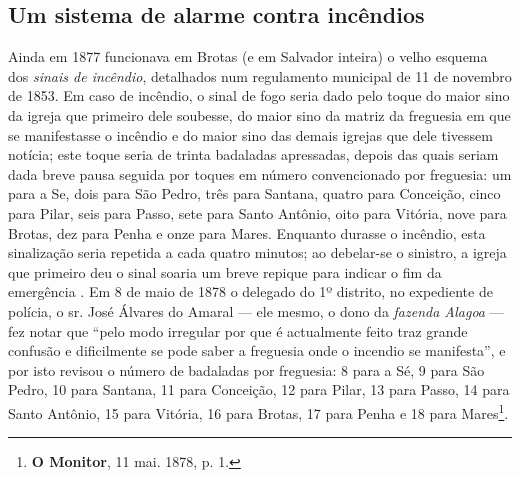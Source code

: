 \subsection{Um sistema de alarme contra incêndios}

Ainda em 1877 funcionava em Brotas (e em Salvador inteira) o velho esquema dos \textit{sinais de incêndio}, detalhados num regulamento municipal de 11 de novembro de 1853. Em caso de incêndio, o sinal de fogo seria dado pelo toque do maior sino da igreja que primeiro dele soubesse, do maior sino da matriz da freguesia em que se manifestasse o incêndio e do maior sino das demais igrejas que dele tivessem notícia; este toque seria de trinta badaladas apressadas, depois das quais seriam dada breve pausa seguida por toques em número convencionado por freguesia: um para a Se, dois para São Pedro, três para Santana, quatro para Conceição, cinco para Pilar, seis para Passo, sete para Santo Antônio, oito para Vitória, nove para Brotas, dez para Penha e onze para Mares. Enquanto durasse o incêndio, esta sinalização seria repetida a cada quatro minutos; ao debelar-se o sinistro, a igreja que primeiro deu o sinal soaria um breve repique para indicar o fim da emergência \cite[pp.~192-193]{macosta_almana_1877}. Em 8 de maio de 1878 o delegado do 1º distrito, no expediente de polícia, o sr. José Álvares do Amaral --- ele mesmo, o dono da \textit{fazenda Alagoa} --- fez notar que ``pelo modo irregular por que é actualmente feito traz grande confusão e dificilmente se pode saber a freguesia onde o incendio se manifesta'', e por isto revisou o número de badaladas por freguesia: 8 para a Sé, 9 para São Pedro, 10 para Santana, 11 para Conceição, 12 para Pilar, 13 para Passo, 14 para Santo Antônio, 15 para Vitória, 16 para Brotas, 17 para Penha e 18 para Mares\footnote{\textbf{O Monitor}, 11 mai. 1878, p. 1.}.